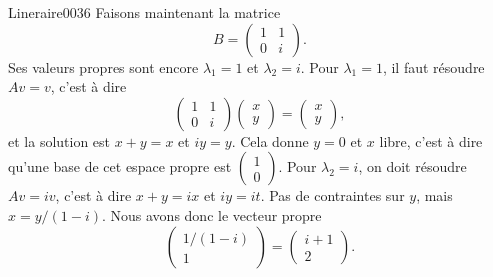 \begin{corrige}{Lineraire0036}
	Faisons maintenant la matrice
	\begin{equation}
		B=\begin{pmatrix}
			1	&	1	\\ 
			0	&	i	
		\end{pmatrix}.
	\end{equation}
	Ses valeurs propres sont encore $\lambda_1=1$ et $\lambda_2=i$. Pour $\lambda_1=1$, il faut résoudre $Av=v$, c'est à dire
	\begin{equation}
		\begin{pmatrix}
			1	&	1	\\ 
			0	&	i	
		\end{pmatrix}\begin{pmatrix}
			x	\\ 
			y	
		\end{pmatrix}=\begin{pmatrix}
			x	\\ 
			y	
		\end{pmatrix},
	\end{equation}
	et la solution est $x+y=x$ et $iy=y$. Cela donne $y=0$ et $x$ libre, c'est à dire qu'une base de cet espace propre est $\begin{pmatrix}
		1	\\ 
		0	
	\end{pmatrix}$. Pour $\lambda_2=i$, on doit résoudre $Av=iv$, c'est à dire $x+y=ix$ et $iy=it$. Pas de contraintes sur $y$, mais $x=y/(1-i)$. Nous avons donc le vecteur propre
	\begin{equation}
		\begin{pmatrix}
			1/(1-i)	\\ 
			1	
		\end{pmatrix}=\begin{pmatrix}
			i+1	\\ 
			2	
		\end{pmatrix}.
	\end{equation}

\end{corrige}
